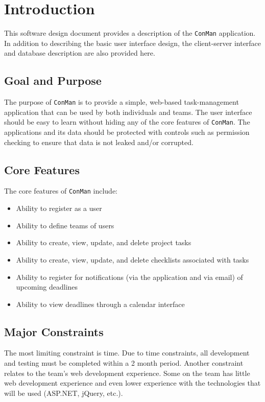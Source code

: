 \documentclass{article}
\begin{document}

\normalsize

\newpage
\tableofcontents

\newpage
\section{Introduction}
This software design document provides a description of the \texttt{ConMan} application.  In addition to describing the basic user interface design, the client-server interface and database description are also provided here.

\subsection{Goal and Purpose}
The purpose of \texttt{ConMan} is to provide a simple, web-based task-management application that can be used by both individuals and teams. The user interface should be easy to learn without hiding any of the core features of \texttt{ConMan}. The applications and its data should be protected with controls such as permission checking to ensure that data is not leaked and/or corrupted. 

\subsection{Core Features}
The core features of \texttt{ConMan} include:
\begin{itemize}
\item Ability to register as a user
\item Ability to define teams of users
\item Ability to create, view, update, and delete project tasks
\item Ability to create, view, update, and delete checklists associated with tasks
\item Ability to register for notifications (via the application and via email) of upcoming deadlines
\item Ability to view deadlines through a calendar interface
\end{itemize}

\subsection{Major Constraints}
The most limiting constraint is time. Due to time constraints, all development and testing must be completed within a 2 month period. Another constraint relates to the team's web development experience. Some on the team has little web development experience and even lower experience with the technologies that will be used (ASP.NET, jQuery, etc.).
\end{document}
